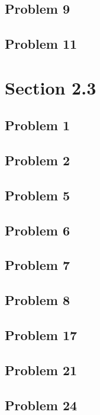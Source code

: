 \documentclass[11pt]{article}
\begin{document}
\subsection*{Problem 9}

\subsection*{Problem 11}

\section*{Section 2.3}
\subsection*{Problem 1}

\subsection*{Problem 2}

\subsection*{Problem 5}

\subsection*{Problem 6}

\subsection*{Problem 7}

\subsection*{Problem 8}

\subsection*{Problem 17}

\subsection*{Problem 21}

\subsection*{Problem 24}
\end{document}
